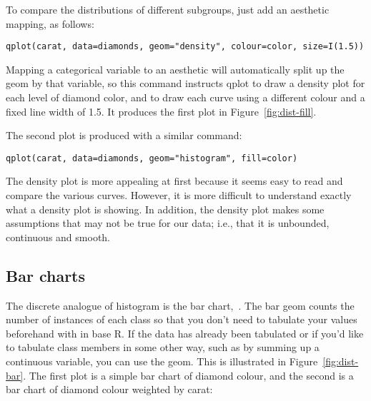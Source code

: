 To compare the distributions of different subgroups, just add an aesthetic mapping, as follows:

{\tt qplot(carat, data=diamonds, geom="density", colour=color, size=I(1.5))}

Mapping a categorical variable to an aesthetic will automatically split up the geom by that variable, so this command instructs qplot to draw a density plot for each level of diamond color, and to draw each curve using a different colour and a fixed line width of 1.5. It produces the first plot in Figure~\ref{fig:dist-fill}.

The second plot is produced with a similar command:

{\tt qplot(carat, data=diamonds, geom="histogram", fill=color)}

The density plot is more appealing at first because it seems easy to read and compare the various curves. However, it is more difficult to understand exactly what a density plot is showing.  In addition, the density plot makes some assumptions that may not be true for our data; i.e., that it is unbounded, continuous and smooth.

% 


\subsection{Bar charts}
\label{sub:bar}

The discrete analogue of histogram is the bar chart,~.  The bar geom counts the number of instances of each class so that you don't need to tabulate your values beforehand with  in base R.  If the data has already been tabulated or if you'd like to tabulate class members in some other way, such as by summing up a continuous variable, you can use the  geom. This is illustrated in Figure~\ref{fig:dist-bar}.  The first plot is a simple bar chart of diamond colour, and the second is a bar chart of diamond colour weighted by carat:


